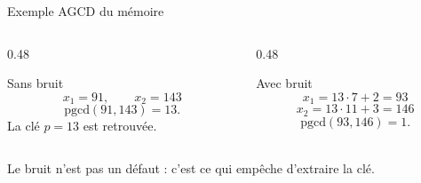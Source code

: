 \documentclass[10pt,aspectratio=169]{beamer}
\begin{document}
\begin{frame}{Exemple AGCD du mémoire}
  \begin{columns}[T,onlytextwidth]
    \begin{column}{0.48\textwidth}
      \begin{block}{Sans bruit}
        \[
          x_1=91,\qquad x_2=143
        \]
        \[
          \mathrm{pgcd}(91,143)=13.
        \]
        La clé $p=13$ est retrouvée.
      \end{block}
    \end{column}
    \begin{column}{0.48\textwidth}
      \begin{exampleblock}{Avec bruit}
        \[
          x_1=13\cdot 7+2=93
        \]
        \[
          x_2=13\cdot 11+3=146
        \]
        \[
          \mathrm{pgcd}(93,146)=1.
        \]
      \end{exampleblock}
    \end{column}
  \end{columns}

  \vspace{0.25cm}
  Le bruit n'est pas un défaut : c'est ce qui empêche d'extraire la clé.
\end{frame}



\end{document}
